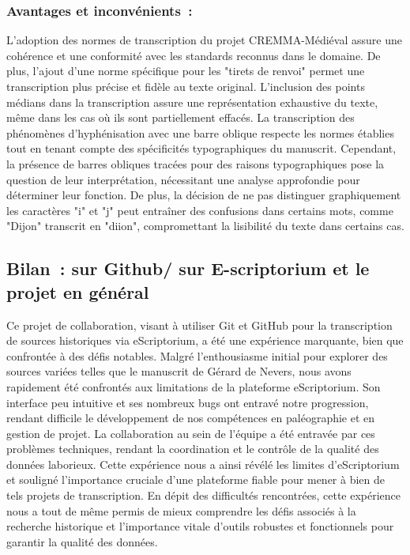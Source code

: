 \documentclass[12pt,a4paper,oneside,titlepage]{article} %
\begin{document}
\subsubsection{Avantages et inconvénients :}

L'adoption des normes de transcription du projet CREMMA-Médiéval assure une cohérence et une conformité avec les standards reconnus dans le domaine. De plus, l'ajout d'une norme spécifique pour les "tirets de renvoi" permet une transcription plus précise et fidèle au texte original. L'inclusion des points médians dans la transcription assure une représentation exhaustive du texte, même dans les cas où ils sont partiellement effacés. La transcription des phénomènes d'hyphénisation avec une barre oblique respecte les normes établies tout en tenant compte des spécificités typographiques du manuscrit. Cependant, la présence de barres obliques tracées pour des raisons typographiques pose la question de leur interprétation, nécessitant une analyse approfondie pour déterminer leur fonction. De plus, la décision de ne pas distinguer graphiquement les caractères "i" et "j" peut entraîner des confusions dans certains mots, comme "Dijon" transcrit en "diion", compromettant la lisibilité du texte dans certains cas.

\subsection{Bilan : sur Github/ sur E-scriptorium et le projet en général}

Ce projet de collaboration, visant à utiliser Git et GitHub pour la transcription de sources historiques via eScriptorium, a été une expérience marquante, bien que confrontée à des défis notables. 
Malgré l'enthousiasme initial pour explorer des sources variées telles que le manuscrit de Gérard de Nevers, nous avons rapidement été confrontés aux limitations de la plateforme eScriptorium. 
Son interface peu intuitive et ses nombreux bugs ont entravé notre progression, rendant difficile le développement de nos compétences en paléographie et en gestion de projet. 
La collaboration au sein de l'équipe a été entravée par ces problèmes techniques, rendant la coordination et le contrôle de la qualité des données laborieux. Cette expérience nous a ainsi révélé les limites d'eScriptorium et souligné l'importance cruciale d'une plateforme fiable pour mener à bien de tels projets de transcription. 
En dépit des difficultés rencontrées, cette expérience nous a tout de même permis de mieux comprendre les défis associés à la recherche historique et l'importance vitale d'outils robustes et fonctionnels pour garantir la qualité des données.
\end{document}
